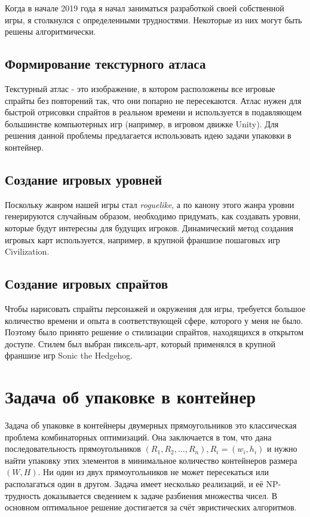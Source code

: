 \documentclass[a4paper,12pt]{report}
\theoremstyle{remark}
\begin{document}
Когда в начале 2019 года я начал заниматься разработкой своей собственной игры, я столкнулся с определенными трудностями. Некоторые из них могут быть решены алгоритмически.

\section{Формирование текстурного атласа}

Текстурный атлас - это изображение, в котором расположены все игровые спрайты без повторений так, что они попарно не пересекаются. Атлас нужен для быстрой отрисовки спрайтов в реальном времени и используется в подавляющем большинстве компьютерных игр (например, в игровом движке Unity\citep{unity}). Для решения данной проблемы предлагается использовать идею задачи упаковки в контейнер.

\section{Создание игровых уровней}

Поскольку жанром нашей игры стал \textit{roguelike}, а по канону этого жанра уровни генерируются случайным образом, необходимо придумать, как создавать уровни, которые будут интересны для будущих игроков. Динамический метод создания игровых карт используется, например, в крупной франшизе пошаговых игр Civilization\citep{civi}.

\section{Создание игровых спрайтов}

Чтобы нарисовать спрайты персонажей и окружения для игры, требуется большое количество времени и опыта в соответствующей сфере, которого у меня не было. Поэтому было принято решение о стилизации спрайтов, находящихся в открытом доступе. Стилем был выбран пиксель-арт, который применялся в крупной франшизе игр Sonic the Hedgehog\citep{sonic}.

\chapter{Задача об упаковке в контейнер} 

\parindent=1cm
Задача об упаковке в контейнеры\citep{Jylanki} двумерных прямоугольников это классическая проблема комбинаторных оптимизаций. Она заключается в том, что дана последовательность прямоугольников $(R_1, R_2, …, R_n), R_i = (w_i, h_i)$ и нужно найти упаковку этих элементов в минимальное количество контейнеров размера $(W, H)$. Ни один из двух прямоугольников не может пересекаться или располагаться один в другом. Задача имеет несколько реализаций, и её NP-трудность доказывается сведением к задаче разбиения множества чисел. В основном оптимальное решение достигается за счёт эвристических алгоритмов.
\end{document}
